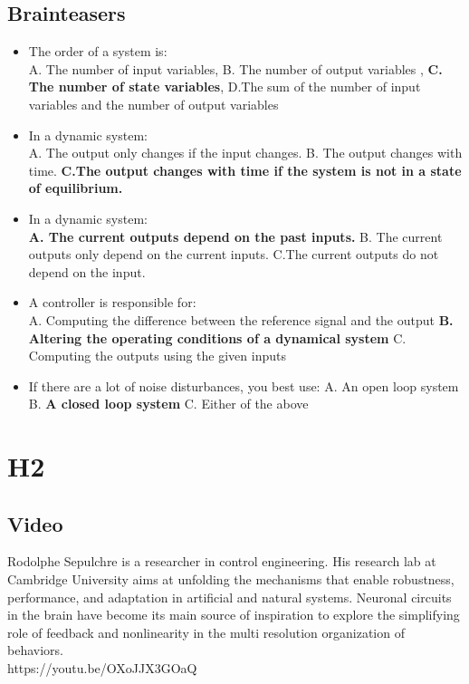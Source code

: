 \documentclass{document}
\begin{document}
		\subsection{Brainteasers}
		\begin{itemize}
			\item The order of a system is:\\
				A. The number of input variables, B. The number of output variables , \textbf{C. The number of state variables}, D.​The sum of the number of input variables and the number of output variables
			\item In a dynamic system: \\
			A. The output only changes if the input changes. B. The output changes with time. \textbf{C.The output changes with time if the system is not in a state of equilibrium.}
			\item In a dynamic system: \\
			\textbf{A. The current outputs depend on the past inputs.} B. The current outputs only depend on the current inputs. C.The current outputs do not depend on the input.
			\item A controller is responsible for:\\
			A. Computing the difference between the reference signal and the output
			\textbf{B. Altering the operating conditions of a dynamical system}
			C. Computing the outputs using the given inputs
			\item If there are a lot of noise disturbances, you best use: 
			A. An open loop system
			B. \textbf{A closed loop system}
			C. 	Either of the above
		\end{itemize}
		
	\section{H2}
		\subsection{Video}
		Rodolphe Sepulchre is a researcher in control engineering. His research lab at Cambridge University
		aims at unfolding the mechanisms that enable robustness, performance, and adaptation in artificial
		and natural systems. Neuronal circuits in the brain have become its main source of inspiration to explore the simplifying role of feedback and nonlinearity in the multi resolution organization of behaviors.\\
		https://youtu.be/OXoJJX3GOaQ
\end{document}
